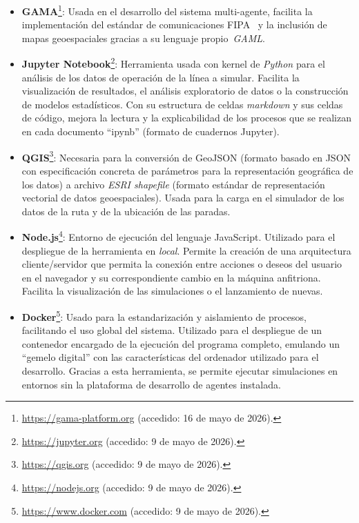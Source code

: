 \begin{itemize}


\item \textbf{GAMA}\footnote{\url{https://gama-platform.org} (accedido: 16 de mayo de 2026).}:
Usada en el desarrollo del sistema multi-agente, facilita la implementación del estándar de comunicaciones FIPA~\cite{fipa2002acl} y la inclusión de mapas geoespaciales gracias a su lenguaje propio~\textit{GAML}.

\item \textbf{Jupyter Notebook}\footnote{\url{https://jupyter.org} (accedido: 9 de mayo de 2026).}:
Herramienta usada con kernel de \textit{Python} para el análisis de los datos de operación de la línea a simular. Facilita la visualización de resultados, el análisis exploratorio de datos o la construcción de modelos estadísticos. Con  su estructura de celdas \textit{markdown} y sus celdas de código, mejora la lectura y la explicabilidad de los procesos que se realizan en cada documento \enquote{ipynb} (formato de cuadernos Jupyter).

\item \textbf{QGIS}\footnote{\url{https://qgis.org} (accedido: 9 de mayo de 2026).}:
Necesaria para la conversión de GeoJSON (formato basado en JSON con especificación concreta de parámetros para la representación geográfica de los datos) a archivo \textit{ESRI shapefile} (formato estándar de representación vectorial de datos geoespaciales). Usada para la carga en el simulador de los datos de la ruta y de la ubicación de las paradas.

\item \textbf{Node.js}\footnote{\url{https://nodejs.org} (accedido: 9 de mayo de 2026).}:
Entorno de ejecución del lenguaje JavaScript. Utilizado para el despliegue de la herramienta en \textit{local}. Permite la creación de una arquitectura cliente/servidor que permita la conexión entre acciones o deseos del usuario en el navegador y su correspondiente cambio en la máquina anfitriona. Facilita la visualización de las simulaciones o el lanzamiento de nuevas.

\item \textbf{Docker}\footnote{\url{https://www.docker.com} (accedido: 9 de mayo de 2026).}:
Usado para la estandarización y aislamiento de procesos, facilitando el uso global del sistema. Utilizado para el despliegue de un contenedor encargado de la ejecución del programa completo, emulando un \enquote{gemelo digital} con las características del ordenador utilizado para el desarrollo. Gracias a esta herramienta, se permite ejecutar simulaciones en entornos sin la plataforma de desarrollo de agentes instalada.


\end{itemize}
